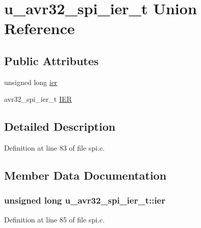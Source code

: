 \hypertarget{unionu__avr32__spi__ier__t}{}\section{u\+\_\+avr32\+\_\+spi\+\_\+ier\+\_\+t Union Reference}
\label{unionu__avr32__spi__ier__t}
\subsection*{Public Attributes}
\begin{DoxyCompactItemize}
\item 
unsigned long \hyperlink{unionu__avr32__spi__ier__t_adeeda709accca980f709f74e968d9fc1}{ier}
\item 
avr32\+\_\+spi\+\_\+ier\+\_\+t \hyperlink{unionu__avr32__spi__ier__t_ab999f7265b21cf8e7d3e1997ce8088f6}{I\+E\+R}
\end{DoxyCompactItemize}


\subsection{Detailed Description}


Definition at line 83 of file spi.\+c.



\subsection{Member Data Documentation}
\hypertarget{unionu__avr32__spi__ier__t_adeeda709accca980f709f74e968d9fc1}{}
\subsubsection[{ier}]{\setlength{\rightskip}{0pt plus 5cm}unsigned long u\+\_\+avr32\+\_\+spi\+\_\+ier\+\_\+t\+::ier}\label{unionu__avr32__spi__ier__t_adeeda709accca980f709f74e968d9fc1}


Definition at line 85 of file spi.\+c.

\hypertarget{unionu__avr32__spi__ier__t_ab999f7265b21cf8e7d3e1997ce8088f6}{}
